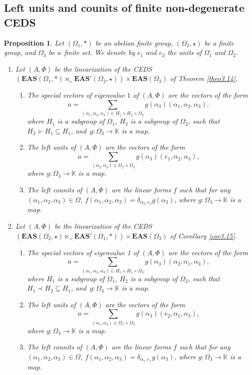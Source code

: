 \documentclass[10pt,a4paper]{amsart}
\numberwithin{equation}{section}
\newtheorem{Proposition}[Theorem]{Proposition}
 { \theoremstyle{definition}
\newtheorem{Definition}[Theorem]{Definition}
\newtheorem{Note}[Theorem]{Note}
\newtheorem{Example}[Theorem]{Example}
\newtheorem{Remark}[Theorem]{Remark}
\newtheorem{Notation}[Theorem]{Notation}}
\newcommand{\eas}{\mathbf{EAS}}
\begin{document}
\subsection{Left units and counits of finite non-degenerate CEDS}

\begin{Proposition}\label{prop4.5}
Let $(\Omega_1,*)$ be an abelian finite group, $(\Omega_2,\star)$ be a finite group, and $\Omega_3$ be a~finite set. We denote by $e_1$ and $e_2$ the units of $\Omega_1$ and $\Omega_2$.
\begin{enumerate}\itemsep=0pt
\item[$(1)$] Let $(A,\Phi)$ be the linearization of the CEDS
$(\eas(\Omega_1,*) \rtimes_\succ \eas'(\Omega_2,\star))\times \eas(\Omega_3)$
of Theorem {\rm\ref{theo3.14}}.
\begin{enumerate}\itemsep=0pt
\item[$(a)$] The special vectors of eigenvalue $1$ of $(A,\Phi)$ are the vectors of the form
\[a=\sum_{(\alpha_1,\alpha_2,\alpha_3)\in H_1\times H_2\times \Omega_3}g(\alpha_3)(\alpha_1,\alpha_2,\alpha_3),\]
where $H_1$ is a subgroup of $\Omega_1$, $H_2$ is a subgroup of $\Omega_2$, such that $H_2\succ H_1\subseteq H_1$, and~${g\colon \Omega_3\longrightarrow \mathbb{K}}$ is a map.
\item[$(b)$] The left units of $(A,\Phi)$ are the vectors of the form
\[a=\sum_{(\alpha_2,\alpha_3)\in \Omega_2\times \Omega_3}g(\alpha_3)(e_1,\alpha_2,\alpha_3),\]
where $g\colon \Omega_3\longrightarrow \mathbb{K}$ is a map.
\item[$(c)$] The left counits of $(A,\Phi)$ are the linear forms $f$ such that for any $(\alpha_1,\alpha_2,\alpha_3)\in \Omega$,
$f(\alpha_1,\alpha_2,\alpha_3)=\delta_{\alpha_2,e_2}g(\alpha_3)$,
where $g\colon \Omega_3\longrightarrow \mathbb{K}$ is a map.
\end{enumerate}
\item[$(2)$] Let $(A,\Phi)$ be the linearization of the CEDS
$(\eas(\Omega_2,\star) \ltimes_\prec \eas'(\Omega_1,*))\times \eas(\Omega_3)$
of Corollary {\rm\ref{cor3.15}}.
\begin{enumerate}\itemsep=0pt
\item[$(a)$] The special vectors of eigenvalue 1 of $(A,\Phi)$ are the vectors of the form
\[a=\sum_{(\alpha_1,\alpha_2,\alpha_3)\in H_1\times H_2\times \Omega_3}g(\alpha_3)(\alpha_2,\alpha_1,\alpha_3),\]
where $H_1$ is a subgroup of $\Omega_1$, $H_2$ is a subgroup of $\Omega_2$, such that $H_1\prec H_2\subseteq H_1$, and~${g\colon \Omega_3\longrightarrow \mathbb{K}}$ is a map.
\item[$(b)$] The left units of $(A,\Phi)$ are the vectors of the form
\[a=\sum_{(\alpha_1,\alpha_3)\in \Omega_1\times \Omega_3}g(\alpha_3)(e_2,\alpha_1,\alpha_3),\]
where $g\colon \Omega_3\longrightarrow \mathbb{K}$ is a map.
\item[$(c)$] The left counits of $(A,\Phi)$ are the linear forms $f$ such that for any $(\alpha_1,\alpha_2,\alpha_3)\in \Omega$,
$f(\alpha_1,\alpha_2,\alpha_3)=\delta_{\alpha_1,e_1}g(\alpha_3)$,
where $g\colon \Omega_3\longrightarrow \mathbb{K}$ is a map.
\end{enumerate} \end{enumerate}\end{Proposition}
\end{document}
